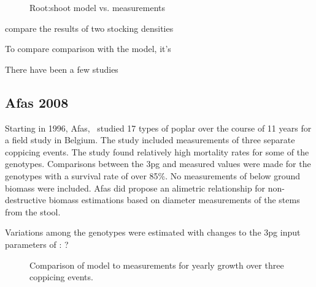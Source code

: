 \documentclass[10pt]{article}
\begin{document}
\begin{figure}[!ht]
  \centering
    
  \caption{Root:shoot model vs. measurements}
  \label{fig:proe-rootshoot}
\end{figure}

\cite{proe02} compare the results of two stocking densities

To compare comparison with the
model, it's 

There have been a few studies



\subsection*{Afas 2008}
\label{afas2008}

Starting in 1996, Afas,~\cite{Afas2008a} studied 17 types of poplar
over the course of 11 years for a field study in Belgium.  The study
included measurements of three separate coppicing events.  The study
found relatively high mortality rates for some of the genotypes.
Comparisons between the \ac{3pg} and measured values were made for the
genotypes with a survival rate of over 85\%.  No measurements of below
ground biomass were included.  Afas did propose an alimetric
relationship for non-destructive biomass estimations based on diameter
measurements of the stems from the stool.

Variations among the genotypes were estimated with changes to the \ac{3pg}
input parameters of : ?

\begin{table}[!ht]
  \centering
    
  \caption{\ac{3pg} parameter variations of \ac{3pg} among genotypes}
  \label{tab:afas-3pg}
\end{table}

\begin{figure}[!ht]
  \centering
  
  \caption{Comparison of model to measurements for yearly growth over three
    coppicing events.}
\label{fig:afas-biomass}
\end{figure}

\end{document}
